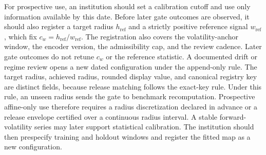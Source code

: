 \documentclass[5p,times,authoryear]{elsarticle}
\theoremstyle{plain}
\begin{document}
For prospective use, an institution should set a calibration cutoff and use only information available by this date. Before later gate outcomes are observed, it should also register a target radius $h_{\mathrm{ref}}$ and a strictly positive reference signal $w_{\mathrm{ref}}$, which fix $c_w=h_{\mathrm{ref}}/w_{\mathrm{ref}}$. The registration also covers the volatility-anchor window, the encoder version, the admissibility cap, and the review cadence. Later gate outcomes do not retune $c_w$ or the reference statistic. A documented drift or regime review opens a new dated configuration under the append-only rule. The target radius, achieved radius, rounded display value, and canonical registry key are distinct fields, because release matching follows the exact-key rule. Under this rule, an unseen radius sends the gate to benchmark recomputation. Prospective affine-only use therefore requires a radius discretization declared in advance or a release envelope certified over a continuous radius interval. A stable forward-volatility series may later support statistical calibration. The institution should then prespecify training and holdout windows and register the fitted map as a new configuration.
\end{document}
